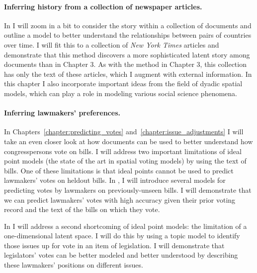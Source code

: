 \paragraph{Inferring history from a collection of newspaper articles.}
In  I will zoom in a bit to consider the
story within a collection of documents and outline a model to better
understand the relationships between pairs of countries over time.  I
will fit this to a collection of \emph{New York Times} articles and
demonstrate that this method discovers a more sophisticated latent
story among documents than in Chapter 3.  As with the method in Chapter
3, this collection has only the text of these articles, which I
augment with external information.  In this chapter I also incorporate
important ideas from the field of dyadic spatial models, which can
play a role in modeling various social science phenomena.


\paragraph{Inferring lawmakers' preferences.}

In Chapters~\ref{chapter:predicting_votes}
and~\ref{chapter:issue_adjustments} I will take an even closer look at
how documents can be used to better understand how congresspersons vote on
bills.  I will address two important limitations of ideal point models
(the state of the art in spatial voting models) by using the text of
bills.  One of these limitations is that ideal points cannot be used
to predict lawmakers' votes on heldout bills.  In
, I will introduce several models for
predicting votes by lawmakers on previously-unseen bills.  I will
demonstrate that we can predict lawmakers' votes with high accuracy
given their prior voting record and the text of the bills on which
they vote.

In  I will address a second shortcoming of
ideal point models: the limitation of a one-dimensional latent space.
I will do this by using a topic model to identify those issues up for
vote in an item of legislation.  I will demonstrate that legislators'
votes can be better modeled and better understood by describing these
lawmakers' positions on different issues.

